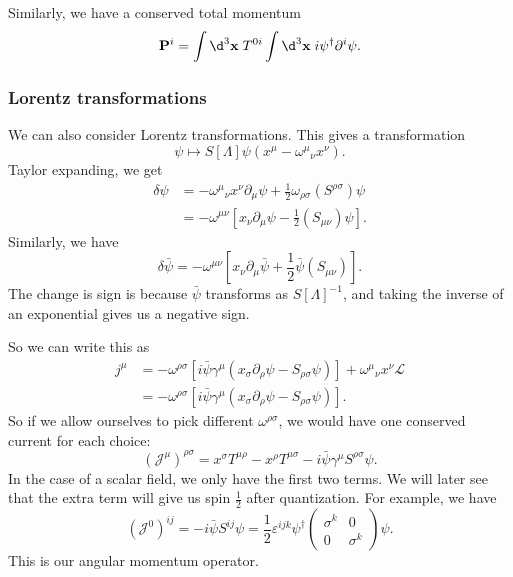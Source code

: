 \documentclass[a4paper]{article}
\begin{document}
Similarly, we have a conserved total momentum
\[
  \mathbf{P}^i = \int \d^3 \mathbf{x}\; T^{0i} \int \d^3 \mathbf{x}\; i \psi^\dagger \partial^i \psi.
\]

\subsubsection*{Lorentz transformations}
We can also consider Lorentz transformations. This gives a transformation
\[
  \psi \mapsto S[\Lambda] \psi(x^\mu - \omega^\mu\!_\nu x^\nu).
\]
Taylor expanding, we get
\begin{align*}
  \delta \psi &=- \omega^\mu\!_\nu x^\nu \partial_\mu \psi + \frac{1}{2} \omega_{\rho\sigma} (S^{\rho\sigma}) \psi\\
  &= - \omega^{\mu\nu}\left[x_\nu \partial_\mu \psi - \frac{1}{2}(S_{\mu\nu}) \psi\right].
\end{align*}
Similarly, we have
\[
  \delta \bar\psi = - \omega^{\mu\nu} \left[x_\nu \partial_\mu \bar\psi + \frac{1}{2} \bar\psi (S_{\mu\nu})\right].
\]
The change is sign is because $\bar\psi$ transforms as $S[\Lambda]^{-1}$, and taking the inverse of an exponential gives us a negative sign.

So we can write this as
\begin{align*}
  j^\mu &= - \omega^{\rho\sigma}\left[i \bar\psi \gamma^\mu (x_\sigma \partial_\rho \psi - S_{\rho\sigma} \psi)\right] + \omega^\mu\!_\nu x^\nu \mathcal{L}\\
  &= - \omega^{\rho\sigma}\left[i \bar\psi \gamma^\mu (x_\sigma \partial_\rho \psi - S_{\rho\sigma} \psi)\right].
\end{align*}
So if we allow ourselves to pick different $\omega^{\rho\sigma}$, we would have one conserved current for each choice:
\[
  (\mathcal{J}^\mu)^{\rho\sigma} = x^\sigma T^{\mu\rho} - x^\rho T^{\mu\sigma} - i \bar\psi \gamma^\mu S^{\rho\sigma} \psi.
\]
In the case of a scalar field, we only have the first two terms. We will later see that the extra term will give us spin $\frac{1}{2}$ after quantization. For example, we have
\[
  (\mathcal{J}^0)^{ij} = -i \bar\psi S^{ij} \psi = \frac{1}{2} \varepsilon^{ijk}\psi^\dagger
  \begin{pmatrix}
    \sigma^k & 0\\
    0 & \sigma^k
  \end{pmatrix}\psi.
\]
This is our angular momentum operator.
\end{document}

